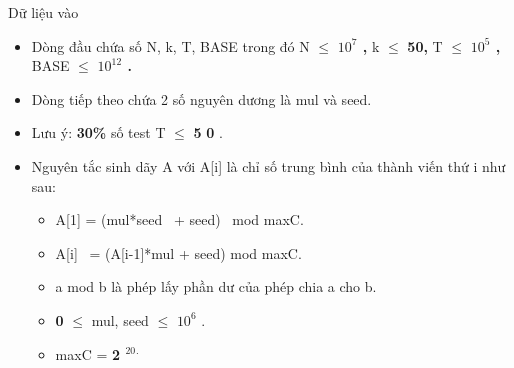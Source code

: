 Dữ liệu vào
\begin{itemize}
	\item      Dòng đầu chứa số N, k, T, BASE trong đó N  $\le$      \textbf{      $10^{7}$      ,     }     k  $\le$      \textbf{      50,     }     T  $\le$      \textbf{      $10^{5}$      ,     }     BASE  $\le$      \textbf{      $10^{12}$      .     }
	\item      Dòng tiếp theo chứa 2 số nguyên dương là mul và seed.    
	\item      Lưu ý:     \textbf{      30\%     }     số test T  $\le$      \textbf{      5     }\textbf{      0     }     .    
	\item      Nguyên tắc sinh dãy A với A[i] là chỉ số trung bình của thành viến thứ i như sau:    
\begin{itemize}
	\item        A[1] = (mul*seed  + seed)  mod maxC.      
	\item        A[i]  = (A[i-1]*mul + seed) mod maxC.      
	\item        a mod b là phép lấy phần dư của phép chia a cho b.      
	\item \textbf{        0       }        $\le$  mul, seed  $\le$        \textbf{        $10^{6}$}       .      
	\item        maxC =       \textbf{\textbf{         2        }$^         20        $$^         .        $}
\end{itemize}
\end{itemize}